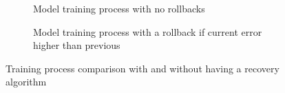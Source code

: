 \begin{figure}[htbp]
  \centering
  \begin{subfigure}[b]{0.45\textwidth}
      \centering
      
      \caption{Model training process with no rollbacks \\ }
      \label{subfig:no-rollback}
  \end{subfigure}
  \hfill
  \begin{subfigure}[b]{0.45\textwidth}
      \centering
      
      \caption{Model training process with a rollback if current error higher than previous}
      \label{subfig:rollback}
  \end{subfigure}
  \caption{Training process comparison with and without having a recovery algorithm}
  \label{fig:rollback}
\end{figure}


